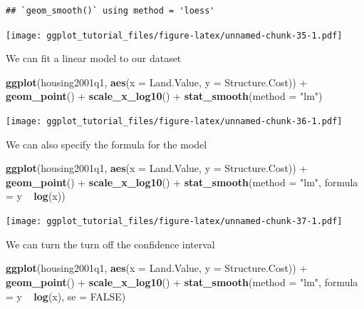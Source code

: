 \documentclass[]{article}
\newenvironment{Shaded}{\begin{snugshade}}{\end{snugshade}}
\newcommand{\KeywordTok}[1]{\textcolor[rgb]{0.13,0.29,0.53}{\textbf{{#1}}}}
\newcommand{\DataTypeTok}[1]{\textcolor[rgb]{0.13,0.29,0.53}{{#1}}}
\newcommand{\StringTok}[1]{\textcolor[rgb]{0.31,0.60,0.02}{{#1}}}
\newcommand{\OtherTok}[1]{\textcolor[rgb]{0.56,0.35,0.01}{{#1}}}
\newcommand{\NormalTok}[1]{{#1}}
\theoremstyle{definition}
\theoremstyle{definition}
\theoremstyle{definition}
\theoremstyle{remark}
\begin{document}
\begin{verbatim}
## `geom_smooth()` using method = 'loess'
\end{verbatim}

\texttt{[image: ggplot\_tutorial\_files/figure-latex/unnamed-chunk-35-1.pdf]}

We can fit a linear model to our dataset

\begin{Shaded}
\begin{Highlighting}[]
\KeywordTok{ggplot}\NormalTok{(housing2001q1, }\KeywordTok{aes}\NormalTok{(}\DataTypeTok{x =} \NormalTok{Land.Value, }\DataTypeTok{y =} \NormalTok{Structure.Cost)) +}\StringTok{ }
\StringTok{  }\KeywordTok{geom_point}\NormalTok{() +}
\StringTok{  }\KeywordTok{scale_x_log10}\NormalTok{() +}
\StringTok{  }\KeywordTok{stat_smooth}\NormalTok{(}\DataTypeTok{method =} \StringTok{"lm"}\NormalTok{)}
\end{Highlighting}
\end{Shaded}

\texttt{[image: ggplot\_tutorial\_files/figure-latex/unnamed-chunk-36-1.pdf]}

We can also specify the formula for the model

\begin{Shaded}
\begin{Highlighting}[]
\KeywordTok{ggplot}\NormalTok{(housing2001q1, }\KeywordTok{aes}\NormalTok{(}\DataTypeTok{x =} \NormalTok{Land.Value, }\DataTypeTok{y =} \NormalTok{Structure.Cost)) +}\StringTok{ }
\StringTok{  }\KeywordTok{geom_point}\NormalTok{() +}
\StringTok{  }\KeywordTok{scale_x_log10}\NormalTok{() +}
\StringTok{  }\KeywordTok{stat_smooth}\NormalTok{(}\DataTypeTok{method =} \StringTok{"lm"}\NormalTok{, }\DataTypeTok{formula =} \NormalTok{y ~}\StringTok{ }\KeywordTok{log}\NormalTok{(x))}
\end{Highlighting}
\end{Shaded}

\texttt{[image: ggplot\_tutorial\_files/figure-latex/unnamed-chunk-37-1.pdf]}

We can turn the turn off the confidence interval

\begin{Shaded}
\begin{Highlighting}[]
\KeywordTok{ggplot}\NormalTok{(housing2001q1, }\KeywordTok{aes}\NormalTok{(}\DataTypeTok{x =} \NormalTok{Land.Value, }\DataTypeTok{y =} \NormalTok{Structure.Cost)) +}\StringTok{ }
\StringTok{  }\KeywordTok{geom_point}\NormalTok{() +}
\StringTok{  }\KeywordTok{scale_x_log10}\NormalTok{() +}
\StringTok{  }\KeywordTok{stat_smooth}\NormalTok{(}\DataTypeTok{method =} \StringTok{"lm"}\NormalTok{, }\DataTypeTok{formula =} \NormalTok{y ~}\StringTok{ }\KeywordTok{log}\NormalTok{(x), }\DataTypeTok{se =} \OtherTok{FALSE}\NormalTok{)}
\end{Highlighting}
\end{Shaded}
\end{document}
